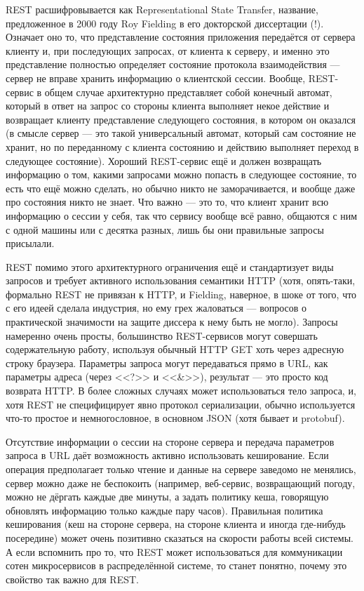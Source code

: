 \documentclass{../../text-style}
\begin{document}
REST расшифровывается как Representational State Transfer, название, предложенное в 2000 году Roy Fielding в его докторской диссертации (!). Означает оно то, что представление состояния приложения передаётся от сервера клиенту и, при последующих запросах, от клиента к серверу, и именно это представление полностью определяет состояние протокола взаимодействия --- сервер не вправе хранить информацию о клиентской сессии. Вообще, REST-сервис в общем случае архитектурно представляет собой конечный автомат, который в ответ на запрос со стороны клиента выполняет некое действие и возвращает клиенту представление следующего состояния, в котором он оказался (в смысле сервер --- это такой универсальный автомат, который сам состояние не хранит, но по переданному с клиента состоянию и действию выполняет переход в следующее состояние). Хороший REST-сервис ещё и должен возвращать информацию о том, какими запросами можно попасть в следующее состояние, то есть что ещё можно сделать, но обычно никто не заморачивается, и вообще даже про состояния никто не знает. Что важно --- это то, что клиент хранит всю информацию о сессии у себя, так что сервису вообще всё равно, общаются с ним с одной машины или с десятка разных, лишь бы они правильные запросы присылали.

REST помимо этого архитектурного ограничения ещё и стандартизует виды запросов и требует активного использования семантики HTTP (хотя, опять-таки, формально REST не привязан к HTTP, и Fielding, наверное, в шоке от того, что с его идеей сделала индустрия, но ему грех жаловаться --- вопросов о практической значимости на защите диссера к нему быть не могло). Запросы намеренно очень просты, большинство REST-сервисов могут совершать содержательную работу, используя обычный HTTP GET хоть через адресную строку браузера. Параметры запроса могут передаваться прямо в URL, как параметры адреса (через <<?>> и <<\&>>), результат --- это просто код возврата HTTP. В более сложных случаях может использоваться тело запроса, и, хотя REST не специфицирует явно протокол сериализации, обычно используется что-то простое и немногословное, в основном JSON (хотя бывает и protobuf).

Отсутствие информации о сессии на стороне сервера и передача параметров запроса в URL даёт возможность активно использовать кеширование. Если операция предполагает только чтение и данные на сервере заведомо не менялись, сервер можно даже не беспокоить (например, веб-сервис, возвращающий погоду, можно не дёргать каждые две минуты, а задать политику кеша, говорящую обновлять информацию только каждые пару часов). Правильная политика кеширования (кеш на стороне сервера, на стороне клиента и иногда где-нибудь посередине) может очень позитивно сказаться на скорости работы всей системы. А если вспомнить про то, что REST может использоваться для коммуникации сотен микросервисов в распределённой системе, то станет понятно, почему это свойство так важно для REST.
\end{document}
